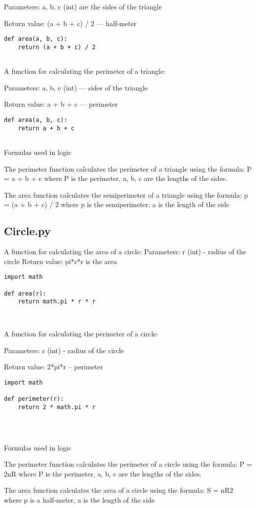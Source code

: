 \documentclass[12pt]{article}
\begin{document}
Parameters:
 a, b, c (int) are the sides of the triangle 

Return value: 
(a + b + c) / 2 — half-meter
\begin{verbatim}
def area(a, b, c):
    return (a + b + c) / 2
    
\end{verbatim}

A function for calculating the perimeter of a triangle: 

Parameters:
a, b, c (int) — sides of the triangle 

Return value:
a + b + c — perimeter 
\begin{verbatim}
def area(a, b, c):
    return a + b + c
    
\end{verbatim}
Formulas used in logic

The perimeter function calculates the perimeter of a triangle using the formula: 
P = a + b + c
where P is the perimeter, a, b, c are the lengths of the sides.

The area function calculates the semiperimeter of a triangle using the formula:
p = (a + b + c) / 2
where p is the semiperimeter, a is the length of the side
\newpage
\subsection{Circle.py}
A function for calculating the area of a circle:
Parameters:
r (int) - radius of the circle
Return value:
pi*r*r is the area
\begin{verbatim}
import math

def area(r):
    return math.pi * r * r

    
\end{verbatim}
A function for calculating the perimeter of a circle:

Parameters:
r (int) - radius of the circle

Return value:
2*pi*r – perimeter
\begin{verbatim}
import math

def perimeter(r):
    return 2 * math.pi * r


    
\end{verbatim}
Formulas used in logic

The perimeter function calculates the perimeter of a circle using the formula: 
P = 2nR
where P is the perimeter, a, b, c are the lengths of the sides.

The area function calculates the area of a circle using the formula:
S = nR2
where p is a half-meter, a is the length of the side
\newpage
\end{document}
